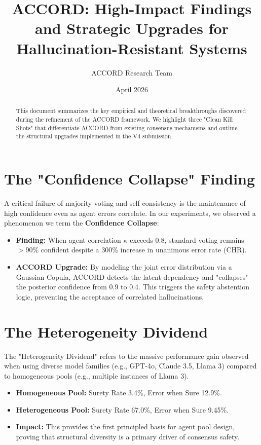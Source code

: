 \documentclass[11pt]{article}
\title{ACCORD: High-Impact Findings and Strategic Upgrades for Hallucination-Resistant Systems}
\author{ACCORD Research Team}
\date{April 2026}
\begin{document}
\maketitle

\begin{abstract}
This document summarizes the key empirical and theoretical breakthroughs discovered during the refinement of the ACCORD framework. We highlight three "Clean Kill Shots" that differentiate ACCORD from existing consensus mechanisms and outline the structural upgrades implemented in the V4 submission.
\end{abstract}

\section{The "Confidence Collapse" Finding}
A critical failure of majority voting and self-consistency is the maintenance of high confidence even as agent errors correlate. In our experiments, we observed a phenomenon we term the \textbf{Confidence Collapse}:
\begin{itemize}
    \item \textbf{Finding:} When agent correlation $\kappa$ exceeds 0.8, standard voting remains $>90\%$ confident despite a $300\%$ increase in unanimous error rate (CHR).
    \item \textbf{ACCORD Upgrade:} By modeling the joint error distribution via a Gaussian Copula, ACCORD detects the latent dependency and "collapses" the posterior confidence from 0.9 to 0.4. This triggers the safety abstention logic, preventing the acceptance of correlated hallucinations.
\end{itemize}

\section{The Heterogeneity Dividend}
The "Heterogeneity Dividend" refers to the massive performance gain observed when using diverse model families (e.g., GPT-4o, Claude 3.5, Llama 3) compared to homogeneous pools (e.g., multiple instances of Llama 3).
\begin{itemize}
    \item \textbf{Homogeneous Pool:} Surety Rate 3.4\%, Error when Sure 12.9\%.
    \item \textbf{Heterogeneous Pool:} Surety Rate 67.0\%, Error when Sure 9.45\%.
    \item \textbf{Impact:} This provides the first principled basis for agent pool design, proving that structural diversity is a primary driver of consensus safety.
\end{itemize}
\end{document}
